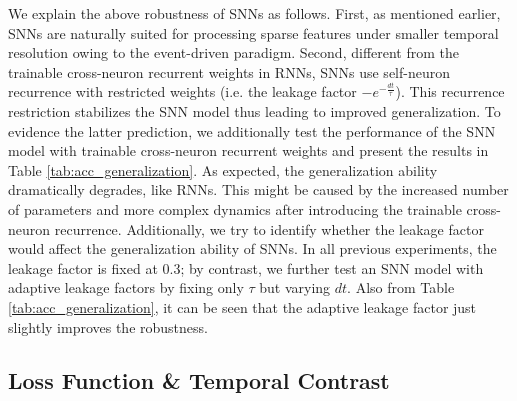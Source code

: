 \documentclass[journal,10pt,twocolumn]{IEEETran}
\begin{document}
We explain the above robustness of SNNs as follows. First, as mentioned earlier, SNNs are naturally suited for processing sparse features under smaller temporal resolution owing to the event-driven paradigm. Second, different from the trainable cross-neuron recurrent weights in RNNs, SNNs use self-neuron recurrence with restricted weights (i.e. the leakage factor $-e^{-\frac{dt}{\tau}}$). This recurrence restriction stabilizes the SNN model thus leading to improved generalization. To evidence the latter prediction, we additionally test the performance of the SNN model with trainable cross-neuron recurrent weights and present the results in Table \ref{tab:acc_generalization}. As expected, the generalization ability dramatically degrades, like RNNs. This might be caused by the increased number of parameters and more complex dynamics after introducing the trainable cross-neuron recurrence. Additionally, we try to identify whether the leakage factor would affect the generalization ability of SNNs. In all previous experiments, the leakage factor is fixed at 0.3; by contrast, we further test an SNN model with adaptive leakage factors by fixing only $\tau$ but varying $dt$. Also from Table \ref{tab:acc_generalization}, it can be seen that the adaptive leakage factor just slightly improves the robustness.


\subsection{Loss Function \& Temporal Contrast}
\end{document}
